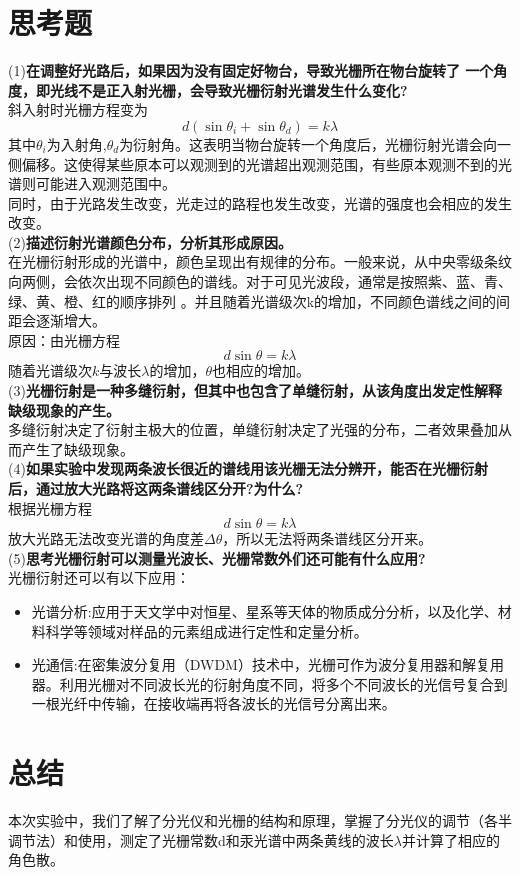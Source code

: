 \documentclass{article}
\begin{document}
\section{思考题}
(1)\textbf{在调整好光路后，如果因为没有固定好物台，导致光栅所在物台旋转了
一个角度，即光线不是正入射光栅，会导致光栅衍射光谱发生什么变化?}\\
\hspace*{2em}斜入射时光栅方程变为
$$
d(\sin\theta_{i}+\sin\theta_{d})=k\lambda
$$
其中$\theta_{i}$为入射角,$\theta_{d}$为衍射角。这表明当物台旋转一个角度后，光栅衍射光谱会向一侧偏移。这使得某些原本可以观测到的光谱超出观测范围，有些原本观测不到的光谱则可能进入观测范围中。\\
\hspace*{2em}同时，由于光路发生改变，光走过的路程也发生改变，光谱的强度也会相应的发生改变。\\
(2)\textbf{描述衍射光谱颜色分布，分析其形成原因。}\\
\hspace*{2em}在光栅衍射形成的光谱中，颜色呈现出有规律的分布。一般来说，从中央零级条纹向两侧，会依次出现不同颜色的谱线。对于可见光波段，通常是按照紫、蓝、青、绿、黄、橙、红的顺序排列 。并且随着光谱级次k的增加，不同颜色谱线之间的间距会逐渐增大。\\
\hspace*{2em}原因：由光栅方程
$$
    d\sin \theta=k\lambda
$$
随着光谱级次$k$与波长$\lambda$的增加，$\theta$也相应的增加。\\
(3)\textbf{光栅衍射是一种多缝衍射，但其中也包含了单缝衍射，从该角度出发定性解释缺级现象的产生。}\\
\hspace*{2em}多缝衍射决定了衍射主极大的位置，单缝衍射决定了光强的分布，二者效果叠加从而产生了缺级现象。\\
(4)\textbf{如果实验中发现两条波长很近的谱线用该光栅无法分辨开，能否在光栅衍射后，通过放大光路将这两条谱线区分开?为什么?}\\
\hspace*{2em}根据光栅方程
$$
d\sin \theta=k\lambda
$$
放大光路无法改变光谱的角度差$\Delta\theta$，所以无法将两条谱线区分开来。\\
(5)\textbf{思考光栅衍射可以测量光波长、光栅常数外们还可能有什么应用?}\\
\hspace*{2em}光栅衍射还可以有以下应用：
\begin{itemize}
    \item 光谱分析:应用于天文学中对恒星、星系等天体的物质成分分析，以及化学、材料科学等领域对样品的元素组成进行定性和定量分析。
    \item 光通信:在密集波分复用（DWDM）技术中，光栅可作为波分复用器和解复用器。利用光栅对不同波长光的衍射角度不同，将多个不同波长的光信号复合到一根光纤中传输，在接收端再将各波长的光信号分离出来。
\end{itemize}
\section{总结}
\hspace*{2em}本次实验中，我们了解了分光仪和光栅的结构和原理，掌握了分光仪的调节（各半调节法）和使用，测定了光栅常数d和汞光谱中两条黄线的波长$\lambda$并计算了相应的角色散。
\end{document}
